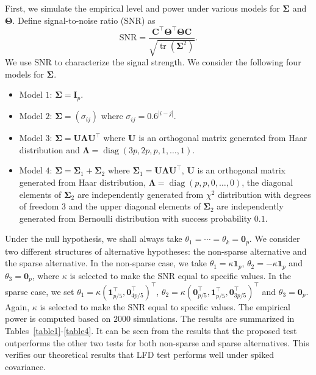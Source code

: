 \documentclass[12pt]{article} %
\DeclareMathOperator{\mytr}{tr}
\DeclareMathOperator{\mydiag}{diag}
\newcommand{\bC}{\mathbf{C}}
\newcommand{\bI}{\mathbf{I}}
\newcommand{\bU}{\mathbf{U}}
\newcommand{\bfsym}[1]{\ensuremath{\boldsymbol{#1}}}
\def\bLambda {\bfsym {\Lambda}}
\def\bSigma {\bfsym {\Sigma}}
\def\bTheta {\bfsym {\Theta}}
\theoremstyle{definition}
\begin{document}
First, we simulate the empirical level and power under various models for $\bSigma$ and $\bTheta$.
Define signal-to-noise ratio (SNR) as
$$
\textrm{SNR}=\frac{ \bC^\top \bTheta^\top \bTheta\bC}{\sqrt{\mytr(\bSigma^2)}}.
$$
We use SNR to characterize the signal strength.
We consider the following four models for $\bSigma$.
\begin{itemize}
    \item Model $1$:
        $\bSigma= \bI_p$.
    \item Model $2$:
        $\bSigma = (\sigma_{ij})$ where $\sigma_{ij}=0.6^{|i-j|}$.
    \item Model $3$:
        $\bSigma= \bU \bLambda \bU^\top$ where $\bU$ is an orthogonal matrix generated from Haar distribution and $\bLambda=\mydiag(3p,2p,p,1,\ldots,1)$.
    \item Model $4$:
        $\bSigma= \bSigma_1+\bSigma_2$ where $\bSigma_1= \bU \bLambda \bU^\top$, $\bU$ is an orthogonal matrix generated from Haar distribution, $\bLambda=\mydiag(p,p,0,\ldots,0)$, the diagonal elements of $\bSigma_2$ are independently generated from $\chi^2$ distribution with degrees of freedom $3$ and the upper diagonal elements of $\bSigma_2$ are independently generated from Bernoulli distribution with success probability $0.1$.
\end{itemize}
Under the null hypothesis, we shall always take $\theta_1=\cdots=\theta_k=\mathbf{0}_p$. We consider two different structures of alternative hypotheses: the non-sparse alternative and the sparse alternative.
In the non-sparse case, we take $\theta_1=\kappa \mathbf 1_p$, $\theta_2=-\kappa \mathbf 1_p$ and $\theta_3=\mathbf{0}_p$, where $\kappa$ is selected to make the SNR equal to specific values.
In the sparse case, we set $\theta_1=\kappa (\mathbf 1_{p/5}^\top,\mathbf{0}_{4p/5}^\top)^\top$, $\theta_2=\kappa (\mathbf{0}_{p/5}^\top, \mathbf 1_{p/5}^\top,\mathbf{0}_{3p/5}^\top)^\top$ and $\theta_3=\mathbf{0}_p$.
Again, $\kappa$ is selected to make the SNR equal to specific values.
The empirical power is computed based on $2000$ simulations.
The results are summarized in Tables~\ref{table1}-\ref{table4}. It can be seen from the results that the proposed test outperforms the other two tests for both non-sparse and sparse alternatives.
This verifies our theoretical results that LFD test performs well under spiked covariance.
\end{document}
